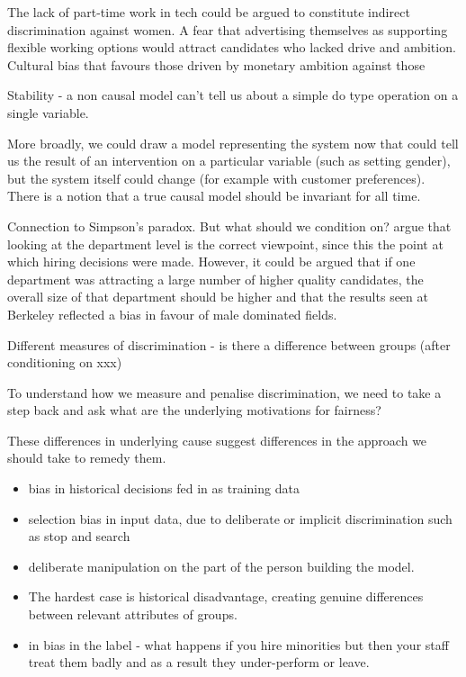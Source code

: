 The lack of part-time work in tech could be argued to constitute indirect discrimination against women. 
A fear that advertising themselves as supporting flexible working options would attract candidates who lacked drive and ambition.
Cultural bias that favours those driven by monetary ambition against those 


Stability - a non causal model can't tell us about a simple do type operation on  a single variable. 

More broadly, we could draw a model representing the system now that could tell us the result of an intervention on a particular variable (such as setting gender), but the system itself could change (for example with customer preferences). There is a notion that a true causal model should be invariant for all time.

Connection to Simpson's paradox. But what should we condition on? \citep{Romie2010} argue that looking at the department level is the correct viewpoint, since this the point at which hiring decisions were made. However, it could be argued that if one department was attracting a large number of higher quality candidates, the overall size of that department should be higher and that the results seen at Berkeley reflected a bias in favour of male dominated fields. 

Different measures of discrimination - is there a difference between groups (after conditioning on xxx)

To understand how we measure and penalise discrimination, we need to take a step back and ask what are the underlying motivations for fairness?

These differences in underlying cause suggest differences in the approach we should take to remedy them.  

\begin{itemize}
\item bias in historical decisions fed in as training data
\item selection bias in input data, due to deliberate or implicit discrimination such as stop and search
\item deliberate manipulation on the part of the person building the model.
\item The hardest case is historical disadvantage, creating genuine differences between relevant attributes of groups.
\item in bias in the label - what happens if you hire minorities but then your staff treat them badly and as a result they under-perform or leave.  
\end{itemize}


